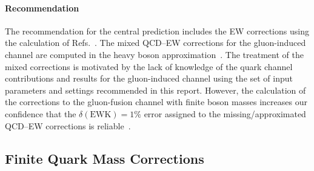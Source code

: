 \paragraph{Recommendation}
The recommendation for the central prediction includes the EW corrections using the calculation of Refs.~\cite{Aglietti:2004nj,Actis:2008ug}.
The mixed QCD--EW corrections for the gluon-induced channel are computed in the heavy boson approximation~\cite{Anastasiou:2008tj}. 
The treatment of the mixed corrections is motivated by the lack of knowledge of the quark channel contributions and results for the gluon-induced channel using the set of input parameters and settings recommended in this report.
However, the calculation of the corrections to the gluon-fusion channel with finite boson masses increases our confidence that the $\delta(\mathrm{EWK})=1\%$ error assigned to the missing/approximated QCD--EW corrections is reliable~\cite{Becchetti:2020wof}.


\subsection{Finite Quark Mass Corrections}
\label{sec:ggf_mq}

